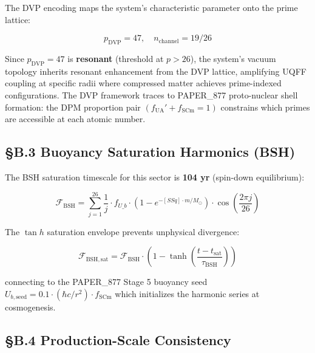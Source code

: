 \documentclass[12pt,a4paper]{article}
\begin{document}
The DVP encoding maps the system's characteristic parameter onto the prime lattice:

\begin{equation}
p_{\mathrm{DVP}} = 47, \quad n_{\mathrm{channel}} = 19/26
\end{equation}

Since $p_{\mathrm{DVP}} = 47$ is \textbf{resonant} (threshold at $p > 26$), the system's vacuum topology inherits resonant enhancement from the DVP lattice, amplifying UQFF coupling at specific radii where compressed matter achieves prime-indexed configurations. The DVP framework traces to PAPER\_877 proto-nuclear shell formation: the DPM proportion pair $(f_{\mathrm{UA}}' + f_{\mathrm{SCm}} = 1)$ constrains which primes are accessible at each atomic number.

\subsection{\S{}B.3 Buoyancy Saturation Harmonics (BSH)}

The BSH saturation timescale for this sector is \textbf{104 yr} (spin-down equilibrium):

\begin{equation}
\mathcal{F}_{\mathrm{BSH}} = \sum_{j=1}^{26} \frac{1}{j} \cdot f_{U\_b} \cdot \left(1 - e^{-[SSq] \cdot m/M_\odot}\right) \cdot \cos\!\left(\frac{2\pi j}{26}\right)
\end{equation}

The $\tan h$ saturation envelope prevents unphysical divergence:

\begin{equation}
\mathcal{F}_{\mathrm{BSH,sat}} = \mathcal{F}_{\mathrm{BSH}} \cdot \left(1 - \tanh\!\left(\frac{t - t_{\mathrm{sat}}}{\tau_{\mathrm{BSH}}}\right)\right)
\end{equation}

connecting to the PAPER\_877 Stage 5 buoyancy seed $U_{b,\mathrm{seed}} = 0.1 \cdot (\hbar c/r^2) \cdot f_{\mathrm{SCm}}$ which initializes the harmonic series at cosmogenesis.

\subsection{\S{}B.4 Production-Scale Consistency}
\end{document}
